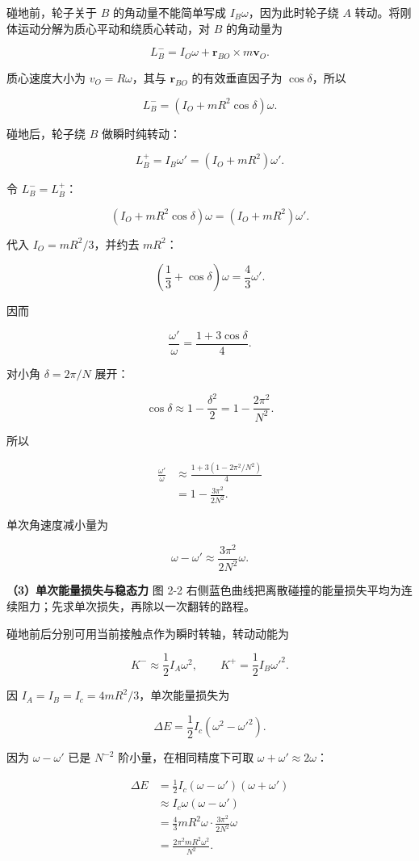 \documentclass[12pt,a4paper,UTF8]{ctexart}
\begin{document}
碰地前，轮子关于 \(B\) 的角动量不能简单写成
\(I_B\omega\)，因为此时轮子绕 \(A\)
转动。将刚体运动分解为质心平动和绕质心转动，对 \(B\) 的角动量为

\[L_B^-=I_O\omega+\bm r_{BO}\times m\bm v_O.\]

质心速度大小为 \(v_O=R\omega\)，其与 \(\bm r_{BO}\) 的有效垂直因子为
\(\cos\delta\)，所以

\[L_B^-=(I_O+mR^2\cos\delta)\omega.\]

碰地后，轮子绕 \(B\) 做瞬时纯转动：

\[L_B^+=I_B\omega'=(I_O+mR^2)\omega'.\]

令 \(L_B^-=L_B^+\)：

\[(I_O+mR^2\cos\delta)\omega=(I_O+mR^2)\omega'.\]

代入 \(I_O=mR^2/3\)，并约去 \(mR^2\)：

\[\left(\frac13+\cos\delta\right)\omega=\frac43\omega'.\]

因而

\[\frac{\omega'}\omega=\frac{1+3\cos\delta}{4}.\]

对小角 \(\delta=2\pi/N\) 展开：

\[\cos\delta\approx1-\frac{\delta^2}{2}
=1-\frac{2\pi^2}{N^2}.\]

所以

\[\begin{aligned}
\frac{\omega'}\omega
&\approx\frac{1+3\left(1-2\pi^2/N^2\right)}4\\
&=1-\frac{3\pi^2}{2N^2}.
\end{aligned}\]

单次角速度减小量为

\[\omega-\omega'\approx\frac{3\pi^2}{2N^2}\omega.\]

\textbf{（3）单次能量损失与稳态力} 图 2-2
右侧蓝色曲线把离散碰撞的能量损失平均为连续阻力；先求单次损失，再除以一次翻转的路程。

碰地前后分别可用当前接触点作为瞬时转轴，转动动能为

\[K^-\approx\frac12I_A\omega^2,\qquad
K^+=\frac12I_B\omega'^2.\]

因 \(I_A=I_B=I_c=4mR^2/3\)，单次能量损失为

\[\Delta E=\frac12I_c(\omega^2-\omega'^2).\]

因为 \(\omega-\omega'\) 已是 \(N^{-2}\) 阶小量，在相同精度下可取
\(\omega+\omega'\approx2\omega\)：

\[\begin{aligned}
\Delta E
&=\frac12I_c(\omega-\omega')(\omega+\omega')\\
&\approx I_c\omega(\omega-\omega')\\
&=\frac43mR^2\omega\cdot\frac{3\pi^2}{2N^2}\omega\\
&=\frac{2\pi^2mR^2\omega^2}{N^2}.
\end{aligned}\]
\end{document}
